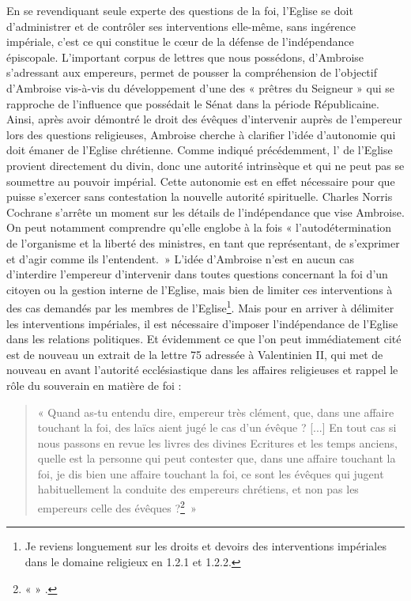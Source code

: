 En se revendiquant seule experte des questions de la foi, l’Eglise se doit d'administrer et de contrôler ses interventions elle-même, sans ingérence impériale, c’est ce qui constitue le cœur de la défense de l’indépendance épiscopale. L’important corpus de lettres que nous possédons, d’Ambroise s’adressant aux empereurs, permet de pousser la compréhension de l’objectif d’Ambroise vis-à-vis du développement d’une  des « prêtres du Seigneur » qui se rapproche de l’influence que possédait le Sénat dans la période Républicaine. Ainsi, après avoir démontré le droit des évêques d’intervenir auprès de l’empereur lors des questions religieuses, Ambroise cherche à clarifier l’idée d’autonomie qui doit émaner de l’Eglise chrétienne. Comme indiqué précédemment, l’  de l’Eglise provient directement du divin, donc une autorité intrinsèque et qui ne peut pas se soumettre au pouvoir impérial. Cette autonomie est en effet nécessaire pour que puisse s’exercer sans contestation la nouvelle autorité spirituelle. Charles Norris Cochrane s’arrête un moment sur les détails de l’indépendance que vise Ambroise. On peut notamment comprendre qu’elle englobe à la fois « l'autodétermination de l’organisme et la liberté des ministres, en tant que représentant, de s’exprimer et d’agir comme ils l’entendent.\autocite[347]{cochrane_christianity}~» L’idée d’Ambroise n’est en aucun cas d’interdire l’empereur d’intervenir dans toutes questions concernant la foi d’un citoyen ou la gestion interne de l’Eglise, mais bien de limiter ces interventions à des cas demandés par les membres de l’Eglise\footnote{Je reviens longuement sur les droits et devoirs des interventions impériales dans le domaine religieux en 1.2.1 et 1.2.2.}. Mais pour en arriver à délimiter les interventions impériales, il est nécessaire d’imposer l’indépendance de l’Eglise dans les relations politiques. Et évidemment ce que l’on peut immédiatement cité est de nouveau un extrait de la lettre 75 adressée à Valentinien II, qui met de nouveau en avant l’autorité ecclésiastique dans les affaires religieuses et rappel le rôle du souverain en matière de foi :

\bigskip

\begin{quote}
    « Quand as-tu entendu dire, empereur très clément, que, dans une affaire touchant la foi, des laïcs aient jugé le cas d’un évêque ? [...] En tout cas si nous passons en revue les livres des divines Ecritures et les temps anciens, quelle est la personne qui peut contester que, dans une affaire touchant la foi, je dis bien une affaire touchant la foi, ce sont les évêques qui jugent habituellement la conduite des empereurs chrétiens, et non pas les empereurs celle des évêques ?\footnote{« \latin{} » \cite[,4]{ambroise_lettres}.}~»
\end{quote}

